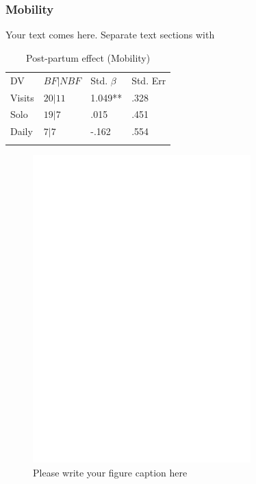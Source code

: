 		\subsubsection{Mobility}
		\label{sec:3.3.3}
Your text comes here. Separate text sections with	

\begin{table}
\caption{Post-partum effect (Mobility)}
\label{tab:bf_mob}  
\begin{tabular}{llll}
\hline\noalign{\smallskip}
DV & $BF|NBF$ & Std. $\beta$ & Std. Err  \\
\noalign{\smallskip}\hline\noalign{\smallskip}
Visits & $20|11$ & 1.049** & .328 \\
Solo & $19|7$ & .015 & .451 \\
Daily & $7|7$ & -.162 & .554 \\
\noalign{\smallskip}\hline
\end{tabular}
\end{table}
		
\begin{figure}[!htb]
  \includegraphics[width=0.75\textwidth]{bfeed_mob}
\caption{Please write your figure caption here}
\label{fig:1}       %
\end{figure}


